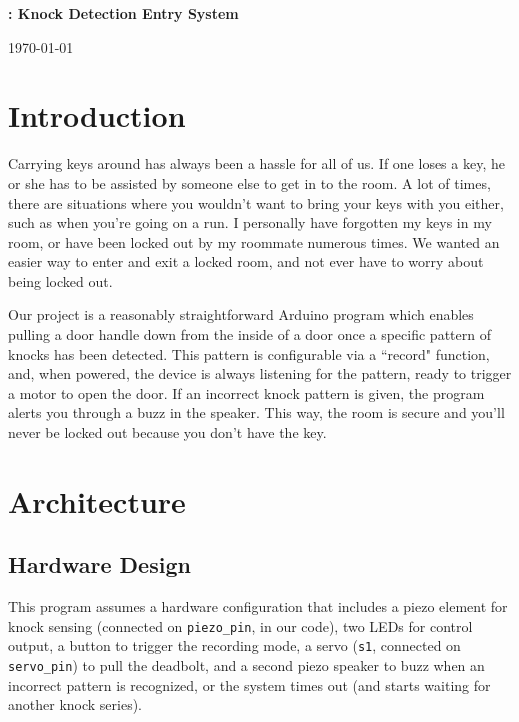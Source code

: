 \documentclass[11pt]{article}			%
\author{Matt Nichols}
\date{\today}
\begin{document}
\centerline{\bf \LARGE\thishw: Knock Detection Entry System}
\centerline{\today}

\section{Introduction}
Carrying keys around has always been a hassle for all of us. If one loses a key, he or she has to be assisted by someone else to get in to the room. A lot of times, there are situations where you wouldn't want to bring your keys with you either, such as when you're going on a run. I personally have forgotten my keys in my room, or have been locked out by my roommate numerous times. We wanted an easier way to enter and exit a locked room, and not ever have to worry about being locked out. 

Our project is a reasonably straightforward Arduino program which enables pulling a door handle down from the inside of a door once a specific pattern of knocks has been detected. This pattern is configurable via a ``record" function, and, when powered, the device is always listening for the pattern, ready to trigger a motor to open the door. If an incorrect knock pattern is given, the program alerts you through a buzz in the speaker. This way, the room is secure and you'll never be locked out because you don't have the key.

\section{Architecture}

\subsection{Hardware Design}

This program assumes a hardware configuration that includes a piezo element for knock sensing (connected on \verb|piezo_pin|, in our code), two LEDs for control output, a button to trigger the recording mode, a servo (\verb|s1|, connected on \verb|servo_pin|) to pull the deadbolt, and a second piezo speaker to buzz when an incorrect pattern is recognized, or the system times out (and starts waiting for another knock series).
\end{document}
